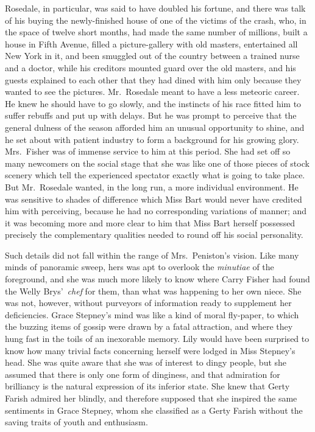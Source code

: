 \documentclass[12pt,a4paper]{book}
\begin{document}
Rosedale, in particular, was said to have doubled his fortune,
and there was talk of his buying the newly-finished house of one
of the victims of the crash, who, in the space of twelve short
months, had made the same number of millions, built a house in
Fifth Avenue, filled a picture-gallery with old masters,
entertained all New York in it, and been smuggled out of the
country between a trained nurse and a doctor, while his creditors
mounted guard over the old masters, and his guests explained to
each other that they had dined with him only because they wanted
to see the pictures. Mr.\ Rosedale meant to have a less meteoric
career. He knew he should have to go slowly, and the instincts of
his race fitted him to suffer rebuffs and put up with delays. But
he was prompt to perceive that the general dulness of the season
afforded him an unusual opportunity to shine, and he set about
with patient industry to form a background for his growing glory. 
Mrs.\ Fisher was of immense service to him at this period. She had
set off so many newcomers on the social stage that she was like
one of those pieces of stock scenery which tell the experienced
spectator exactly what is going to take place. But Mr.\ Rosedale
wanted, in the long run, a more individual environment. He was
sensitive to shades of difference which Miss Bart would never
have credited him with perceiving, because he had no
corresponding variations of manner; and it was becoming more and
more clear to him that Miss Bart herself possessed precisely the
complementary qualities needed to round off his social
personality.





Such details did not fall within the range of Mrs.\ Peniston's
vision. Like many minds of panoramic sweep, hers was apt to
overlook the \textit{minutiae} of the foreground, and she was much more
likely to know where Carry Fisher had found the Welly Brys'\ \textit{chef}
for them, than what was happening to her own niece. She was not,
however, without purveyors of information ready to supplement her
deficiencies. Grace Stepney's mind was like a kind of moral
fly-paper, to which the buzzing items of gossip were drawn by a
fatal attraction, and where they hung fast in the toils of an
inexorable memory. Lily would have been surprised to know how
many trivial facts concerning herself were lodged in Miss
Stepney's head. She was quite aware that she was of interest to
dingy people, but she assumed that there is only one form of
dinginess, and that admiration for brilliancy is the natural
expression of its inferior state. She knew that Gerty Farish
admired her blindly, and therefore supposed that she inspired the
same sentiments in Grace Stepney, whom she classified as a Gerty
Farish without the saving traits of youth and enthusiasm.
\end{document}
